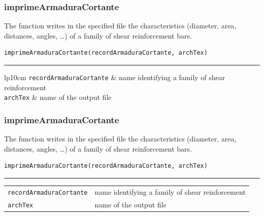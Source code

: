 \subsubsection{imprimeArmaduraCortante}
\noindent The function writes in the specified file the characteristics (diameter, area, distances, angles, \ldots) of a family of shear reinforcement bars.
\begin{verbatim}
imprimeArmaduraCortante(recordArmaduraCortante, archTex)
\end{verbatim}
\vspace{-10pt}
{\color{grayLines} \rule{\linewidth}{0.25pt}}
\begin{center}
\begin{tabular}{lp{10cm}}
{\tt recordArmaduraCortante} & name identifying a family of shear reinforcement \\
{\tt archTex} &  name of the output file \\
\end{tabular}
\end{center}

\subsubsection{imprimeArmaduraCortante}
\noindent The function writes in the specified file the characteristics (diameter, area, distances, angles, \ldots) of a family of shear reinforcement bars.
\begin{verbatim}
imprimeArmaduraCortante(recordArmaduraCortante, archTex)
\end{verbatim}
\vspace{-10pt}
{\color{grayLines} \rule{\linewidth}{0.25pt}}
\begin{center}
\begin{tabular}{lp{10cm}}
{\tt recordArmaduraCortante} & name identifying a family of shear reinforcement \\
{\tt archTex} &  name of the output file \\
\end{tabular}
\end{center}

